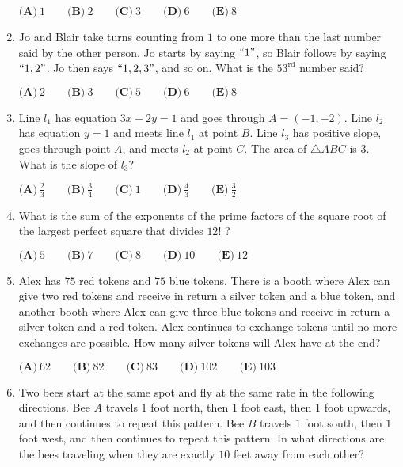 \documentclass{article}
\begin{document}
\begin{enumerate}[label=\arabic*., itemsep=0.5em]
\(\textbf{(A)}\ 1 \qquad \textbf{(B)}\ 2 \qquad \textbf{(C)}\ 3 \qquad \textbf{(D)}\ 6 \qquad \textbf{(E)}\ 8\)\par \vspace{0.5em}\item Jo and Blair take turns counting from \(1\) to one more than the last number said by the other person. Jo starts by saying \(``1"\), so Blair follows by saying \(``1, 2"\). Jo then says \(``1, 2, 3"\), and so on. What is the \(53^{\text{rd}}\) number said?

\(\textbf{(A)}\ 2 \qquad \textbf{(B)}\ 3 \qquad \textbf{(C)}\ 5 \qquad \textbf{(D)}\ 6 \qquad \textbf{(E)}\ 8\)\par \vspace{0.5em}\item Line \(l_1\) has equation \(3x - 2y = 1\) and goes through \(A = (-1, -2)\). Line \(l_2\) has equation \(y = 1\) and meets line \(l_1\) at point \(B\). Line \(l_3\) has positive slope, goes through point \(A\), and meets \(l_2\) at point \(C\). The area of \(\triangle ABC\) is \(3\). What is the slope of \(l_3\)?

\(\textbf{(A)}\ \frac{2}{3} \qquad \textbf{(B)}\ \frac{3}{4} \qquad \textbf{(C)}\ 1 \qquad \textbf{(D)}\ \frac{4}{3} \qquad \textbf{(E)}\ \frac{3}{2}\)\par \vspace{0.5em}\item What is the sum of the exponents of the prime factors of the square root of the largest perfect square that divides \(12!\) ?

\(\textbf{(A)}\ 5 \qquad \textbf{(B)}\ 7 \qquad \textbf{(C)}\ 8 \qquad \textbf{(D)}\ 10 \qquad \textbf{(E)}\ 12 \)\par \vspace{0.5em}\item Alex has \(75\) red tokens and \(75\) blue tokens. There is a booth where Alex can give two red tokens and receive in return a silver token and a blue token, and another booth where Alex can give three blue tokens and receive in return a silver token and a red token. Alex continues to exchange tokens until no more exchanges are possible. How many silver tokens will Alex have at the end?

\(\textbf{(A)}\ 62 \qquad \textbf{(B)}\ 82 \qquad \textbf{(C)}\ 83 \qquad \textbf{(D)}\ 102 \qquad \textbf{(E)}\ 103\)\par \vspace{0.5em}\item Two bees start at the same spot and fly at the same rate in the following directions. Bee \(A\) travels \(1\) foot north, then \(1\) foot east, then \(1\) foot upwards, and then continues to repeat this pattern. Bee \(B\) travels \(1\) foot south, then \(1\) foot west, and then continues to repeat this pattern. In what directions are the bees traveling when they are exactly \(10\) feet away from each other?


\end{enumerate}
\end{document}
